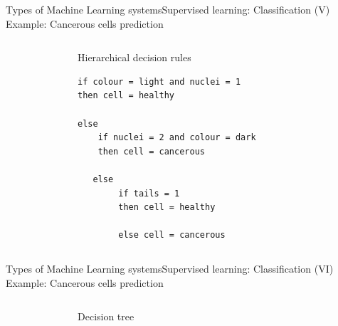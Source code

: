 \documentclass[10pt,compress]{beamer} %
\begin{document}
\begin{frame}[fragile]{Types of Machine Learning systems}{Supervised learning: Classification (V)}
	Example: Cancerous cells prediction
	\begin{columns}
			\begin{figure}
			\centering{
			\resizebox{0.9\textwidth}{!}{}}
			\end{figure}

	   		\begin{exampleblock}{Hierarchical decision rules}
	   		\begin{lstlisting}[firstnumber=1, xleftmargin=10pt]
if colour = light and nuclei = 1 
then cell = healthy   	
			            
else 
    if nuclei = 2 and colour = dark
    then cell = cancerous

   else 
        if tails = 1 
        then cell = healthy

        else cell = cancerous
       \end{lstlisting}
	   	\end{exampleblock}
	\end{columns}
\end{frame}

\begin{frame}[fragile]{Types of Machine Learning systems}{Supervised learning: Classification (VI)}
	Example: Cancerous cells prediction
	\begin{columns}
 	   \column{.10\textwidth}
 	   \column{.20\textwidth}
			\begin{figure}
			\centering{
			\resizebox{0.9\textwidth}{!}{}}
			\end{figure}

 	   \column{.50\textwidth}
	   		\begin{exampleblock}{Decision tree}
				\begin{figure}
				\centering{
				\resizebox{0.9\textwidth}{!}{}}
				\end{figure}
	   		\end{exampleblock}
 	   \column{.20\textwidth}
	\end{columns}
\end{frame}
\end{document}

